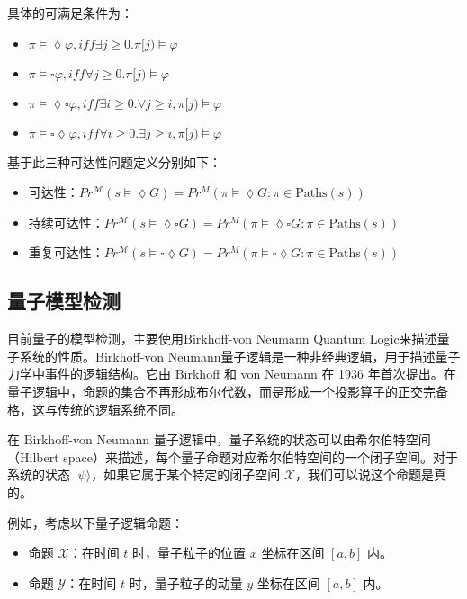 具体的可满足条件为：
\begin{itemize}
    \item \(\pi\models\lozenge\varphi,iff\exists j\ge0.\pi[j)\models\varphi\)
    \item \(\pi\models\square\varphi,iff\forall j\ge 0.\pi[j)\models\varphi\)
    \item \(\pi\models\lozenge\square\varphi,iff\exists i\ge 0.\forall j\ge i,\pi[j)\models\varphi\)
    \item \(\pi\models\square\lozenge\varphi,iff\forall i\ge 0.\exists j\ge i,\pi[j)\models\varphi\)
\end{itemize}
基于此三种可达性问题定义分别如下：
\begin{itemize}
    \item 可达性：\( Pr^{\mathcal{M}}(s \models \lozenge G) = Pr^M(\pi \models \lozenge G : \pi \in \text{Paths}(s))\)
    \item 持续可达性：\( Pr^{\mathcal{M}}(s \models \lozenge \square G) = Pr^M(\pi \models \lozenge \square G : \pi \in \text{Paths}(s))\)
    \item 重复可达性：\( Pr^{\mathcal{M}}(s \models\square \lozenge G) = Pr^M(\pi \models \square\lozenge G : \pi \in \text{Paths}(s))\)
\end{itemize}

\subsection{量子模型检测}
目前量子的模型检测，主要使用Birkhoff-von Neumann Quantum Logic来描述量子系统的性质\citep{birkhoff1987logic}。Birkhoff-von Neumann量子逻辑是一种非经典逻辑，用于描述量子力学中事件的逻辑结构。它由 Birkhoff 和 von Neumann 在 1936 年首次提出。在量子逻辑中，命题的集合不再形成布尔代数，而是形成一个投影算子的正交完备格，这与传统的逻辑系统不同。

在 Birkhoff-von Neumann 量子逻辑中，量子系统的状态可以由希尔伯特空间（Hilbert space）来描述，每个量子命题对应希尔伯特空间的一个闭子空间。对于系统的状态 \(|\psi\rangle\)，如果它属于某个特定的闭子空间 \( \mathcal{X} \)，我们可以说这个命题是真的。

例如，考虑以下量子逻辑命题：

\begin{itemize}
\item 命题 \( \mathcal{X} \)：在时间 \( t \) 时，量子粒子的位置 \( x \) 坐标在区间 \( [a, b] \) 内。
\item 命题 \( \mathcal{Y} \)：在时间 \( t \) 时，量子粒子的动量 \( y \) 坐标在区间 \( [a, b] \) 内。
\end{itemize}

